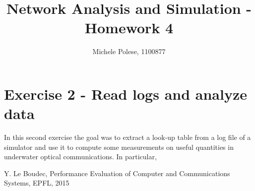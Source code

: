 \documentclass[10pt]{article}
\begin{document}
\title{Network Analysis and Simulation - Homework 4}
\author{Michele Polese, 1100877}

\maketitle

\section*{Exercise 2 - Read logs and analyze data}
In this second exercise the goal was to extract a look-up table from a log file of a simulator and use it to compute some measurements on useful quantities in underwater optical communications. In particular, 


\begin{thebibliography}{10}

Y. Le Boudec, Performance Evaluation of Computer and Communications Systems, EPFL, 2015



\end{thebibliography}
\end{document}
